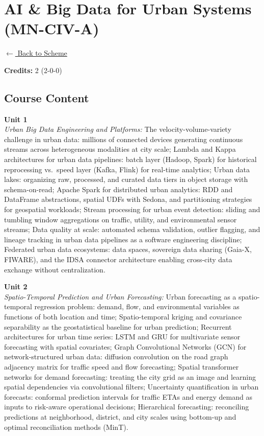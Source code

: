 \section*{AI \& Big Data for Urban Systems (MN-CIV-A)}
\label{minor:CIV_L2}

\noindent \small{\hyperref[main:scheme]{$\leftarrow$ Back to Scheme}} \vspace{0.5cm}

\noindent \textbf{Credits:} 2 (2-0-0)

\subsection*{Course Content}
\noindent\textbf{Unit 1} \\
\textit{Urban Big Data Engineering and Platforms:} The velocity-volume-variety challenge in urban data: millions of connected devices generating continuous streams across heterogeneous modalities at city scale; Lambda and Kappa architectures for urban data pipelines: batch layer (Hadoop, Spark) for historical reprocessing vs.\ speed layer (Kafka, Flink) for real-time analytics; Urban data lakes: organizing raw, processed, and curated data tiers in object storage with schema-on-read; Apache Spark for distributed urban analytics: RDD and DataFrame abstractions, spatial UDFs with Sedona, and partitioning strategies for geospatial workloads; Stream processing for urban event detection: sliding and tumbling window aggregations on traffic, utility, and environmental sensor streams; Data quality at scale: automated schema validation, outlier flagging, and lineage tracking in urban data pipelines as a software engineering discipline; Federated urban data ecosystems: data spaces, sovereign data sharing (Gaia-X, FIWARE), and the IDSA connector architecture enabling cross-city data exchange without centralization.

\vspace{0.3cm}

\noindent\textbf{Unit 2} \\
\textit{Spatio-Temporal Prediction and Urban Forecasting:} Urban forecasting as a spatio-temporal regression problem: demand, flow, and environmental variables as functions of both location and time; Spatio-temporal kriging and covariance separability as the geostatistical baseline for urban prediction; Recurrent architectures for urban time series: LSTM and GRU for multivariate sensor forecasting with spatial covariates; Graph Convolutional Networks (GCN) for network-structured urban data: diffusion convolution on the road graph adjacency matrix for traffic speed and flow forecasting; Spatial transformer networks for demand forecasting: treating the city grid as an image and learning spatial dependencies via convolutional filters; Uncertainty quantification in urban forecasts: conformal prediction intervals for traffic ETAs and energy demand as inputs to risk-aware operational decisions; Hierarchical forecasting: reconciling predictions at neighborhood, district, and city scales using bottom-up and optimal reconciliation methods (MinT).

